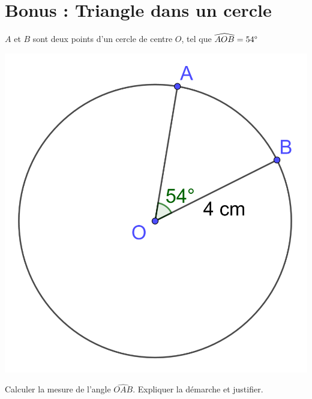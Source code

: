 \section*{Bonus : Triangle dans un cercle}

$A$ et $B$ sont deux points d'un cercle de centre $O$, tel que $\widehat{AOB}=54\degree$

\begin{center}
	\includegraphics[scale=0.15]{img/cercle}
\end{center}

\begin{questions}
	\question Calculer la mesure de l'angle $\widehat{OAB}$. Expliquer la démarche et justifier.
\end{questions}